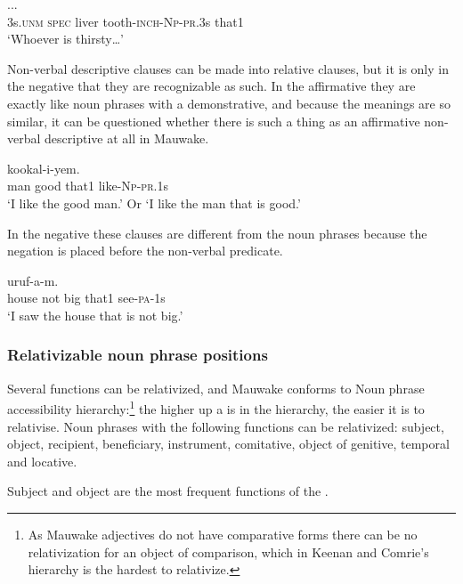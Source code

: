 \ea%
\label{ex:8:x1565}
  ... \\
3s.\textsc{unm} \textsc{spec} liver tooth-\textsc{inch}-\textsc{Np}-\textsc{pr}.3s  that1\\
\glt`Whoever is thirsty{\dots}'
\z


Non-verbal descriptive clauses can be made into relative clauses, but it is only in the negative that they are recognizable as such. In the affirmative they are exactly like noun phrases with a demonstrative, and because the meanings are so similar, it can be questioned whether there is such a thing as an affirmative non-verbal descriptive  at all in Mauwake.  

\ea%
\label{ex:8:x1550}
  kookal-i-yem.\\
man  good  that1  like-\textsc{Np}-\textsc{pr}.1s\\
\glt`I like the good man.' Or `I like the man that is good.'
\z


In the negative these clauses are different from the noun phrases because the negation is placed before the non-verbal predicate.

\ea%
\label{ex:8:x1551}
  uruf-a-m. \\
house  not  big  that1  see-\textsc{pa}-1s\\
\glt`I saw the house that is not big.'
\z


\subsubsection{Relativizable noun phrase positions}

Several  functions can be relativized, and Mauwake conforms to  Noun phrase accessibility hierarchy:\footnote{As Mauwake adjectives do not have comparative forms there can be no relativization for an object of comparison, which in Keenan and Comrie's hierarchy is the hardest to relativize.}  the higher up a  is in the hierarchy, the easier it is to relativise. Noun phrases with the following functions can be relativized: subject, object, recipient, beneficiary, instrument, comitative, object of genitive, temporal and locative. 

Subject  and object  are the most frequent functions of the .

